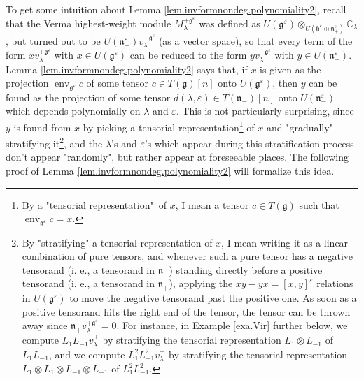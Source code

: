 \documentclass
[numbers=enddot,12pt,final,onecolumn,german,notitlepage]{scrartcl}%
\theoremstyle{definition}
\begin{document}
To get some intuition about Lemma \ref{lem.invformnondeg.polynomiality2},
recall that the Verma highest-weight module $M_{\lambda}^{+\mathfrak{g}%
^{\varepsilon}}$ was defined as $U\left(  \mathfrak{g}^{\varepsilon}\right)
\otimes_{U\left(  \mathfrak{h}^{\varepsilon}\oplus\mathfrak{n}_{+}%
^{\varepsilon}\right)  }\mathbb{C}_{\lambda}$, but turned out to be $U\left(
\mathfrak{n}_{-}^{\varepsilon}\right)  v_{\lambda}^{+\mathfrak{g}%
^{\varepsilon}}$ (as a vector space), so that every term of the form
$xv_{\lambda}^{+\mathfrak{g}^{\varepsilon}}$ with $x\in U\left(
\mathfrak{g}^{\varepsilon}\right)  $ can be reduced to the form $yv_{\lambda
}^{+\mathfrak{g}^{\varepsilon}}$ with $y\in U\left(  \mathfrak{n}%
_{-}^{\varepsilon}\right)  $. Lemma \ref{lem.invformnondeg.polynomiality2}
says that, if $x$ is given as the projection $\operatorname*{env}%
\nolimits_{\mathfrak{g}^{\varepsilon}}c$ of some tensor $c\in T\left(
\mathfrak{g}\right)  \left[  n\right]  $ onto $U\left(  \mathfrak{g}%
^{\varepsilon}\right)  $, then $y$ can be found as the projection of some
tensor $d\left(  \lambda,\varepsilon\right)  \in T\left(  \mathfrak{n}%
_{-}\right)  \left[  n\right]  $ onto $U\left(  \mathfrak{n}_{-}^{\varepsilon
}\right)  $ which depends polynomially on $\lambda$ and $\varepsilon$. This is
not particularly surprising, since $y$ is found from $x$ by picking a
tensorial representation\footnote{By a "tensorial representation"\ of $x$, I
mean a tensor $c\in T\left(  \mathfrak{g}\right)  $ such that
$\operatorname*{env}\nolimits_{\mathfrak{g}^{\varepsilon}}c=x$.} of $x$ and
"gradually" stratifying it\footnote{By "stratifying" a tensorial
representation of $x$, I mean writing it as a linear combination of pure
tensors, and whenever such a pure tensor has a negative tensorand (i. e., a
tensorand in $\mathfrak{n}_{-}$) standing directly before a positive tensorand
(i. e., a tensorand in $\mathfrak{n}_{+}$), applying the $xy-yx=\left[
x,y\right]  ^{\varepsilon}$ relations in $U\left(  \mathfrak{g}^{\varepsilon
}\right)  $ to move the negative tensorand past the positive one. As soon as a
positive tensorand hits the right end of the tensor, the tensor can be thrown
away since $\mathfrak{n}_{+}v_{\lambda}^{+\mathfrak{g}^{\varepsilon}}=0$. For
instance, in Example \ref{exa.Vir} further below, we compute $L_{1}%
L_{-1}v_{\lambda}^{+}$ by stratifying the tensorial representation
$L_{1}\otimes L_{-1}$ of $L_{1}L_{-1}$, and we compute $L_{1}^{2}L_{-1}%
^{2}v_{\lambda}^{+}$ by stratifying the tensorial representation $L_{1}\otimes
L_{1}\otimes L_{-1}\otimes L_{-1}$ of $L_{1}^{2}L_{-1}^{2}$.}, and the
$\lambda$'s and $\varepsilon$'s which appear during this stratification
process don't appear "randomly", but rather appear at foreseeable places. The
following proof of Lemma \ref{lem.invformnondeg.polynomiality2} will formalize
this idea.
\end{document}
